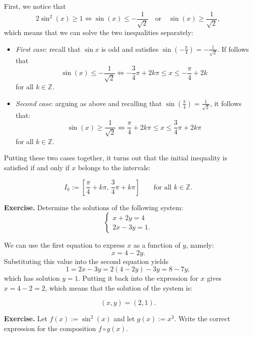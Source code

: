\documentclass[a4paper,10 pt]{report}
\newcommand{\finalanswer}[1]{%
    \begin{finalAnswer}
    \[
        #1
    \]
    \end{finalAnswer}
}
\theoremstyle{definition}
\newcommand{\Z}{\mathbb Z}
\begin{document}
\begin{solutionBox}
First, we notice that
\begin{equation*}2 \sin^2(x) \geq 1 \iff \sin(x) \leq - \frac{1}{\sqrt{2}} \quad \text{or} \quad \sin(x) \geq \frac{1}{\sqrt{2}}, \end{equation*}
which means that we can solve the two inequalities separately:

\begin{itemize}
	\item \textit{First case}: recall that $\sin x$ is odd and satisfies $\sin(- \frac{\pi}{4} ) = - \frac{1}{\sqrt{2}}$. If follows that
\[\sin(x) \leq - \frac{1}{\sqrt{2}} \iff - \frac{3}{4} \pi + 2k \pi \leq x \leq - \frac{\pi}{4} + 2k \]
	for all $k \in \Z$.
	
	\item \textit{Second case}: arguing as above and recalling that $\sin(\frac{\pi}{4} ) = \frac{1}{\sqrt{2}}$, it follows that:
\[
\sin(x) \geq \frac{1}{\sqrt{2}} \iff \frac{\pi}{4} + 2k \pi \leq x \leq \frac{3}{4}\pi + 2k \pi
\]
for all $k \in \Z$.
\end{itemize}

Putting these two cases together, it turns out that the initial inequality is satisfied if and only if $x$ belongs to the intervals:
\finalanswer{I_k := \left[ \frac{\pi}{4} + k \pi, \, \frac{3}{4} \pi + k \pi \right] \qquad \text{for all $k \in \Z$}.}
\end{solutionBox}



\begin{exerciseBox}
\textbf{Exercise.} Determine the solutions of the following system:
\[
\begin{cases}x + 2y = 4 \\ 2x - 3y = 1. \end{cases}
\]
\end{exerciseBox}

\begin{solutionBox}
	We can use the first equation to express $x$ as a function of $y$, namely:
	\[
	x = 4 - 2y.
	\]
	Substituting this value into the second equation yields
	\[
	1 = 2x - 3y = 2(4-2y) - 3y = 8 - 7y,
	\]
	which has solution $y=1$. Putting it back into the expression for $x$ gives $x = 4-2=2$, which means that the solution of the system is:
\finalanswer{(x,y) = (2,1).}
\end{solutionBox}


\begin{exerciseBox}
\textbf{Exercise.} Let $f(x) := \sin^2(x)$ and let $g(x) := x^3$. Write the correct expression for the composition $f \circ g(x)$.
\end{exerciseBox}
\end{document}
